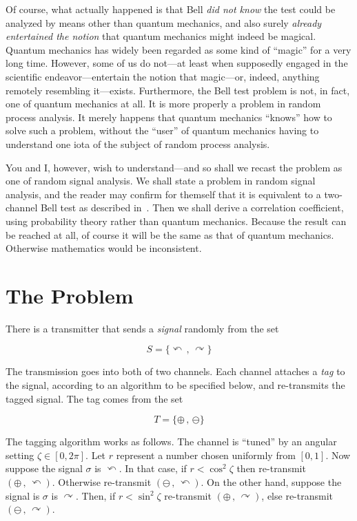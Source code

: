 \documentclass[9pt,technote]{IEEEtran}
\begin{document}
Of course, what actually happened is that Bell {\em{did not know}} the
test could be analyzed by means other than quantum mechanics, and also
surely {\em{already entertained the notion}} that quantum mechanics
might indeed be magical. Quantum mechanics has widely been regarded as
some kind of ``magic'' for a very long time. However, some of us do
not---at least when supposedly engaged in the scientific
endeavor---entertain the notion that magic---or, indeed, anything
remotely resembling it---exists. Furthermore, the Bell test problem is
not, in fact, one of quantum mechanics at all. It is more properly a
problem in random process analysis. It merely happens that quantum
mechanics ``knows'' how to solve such a problem, without the ``user''
of quantum mechanics having to understand one iota of the subject of
random process analysis.

You and I, however, wish to understand---and so shall we recast the
problem as one of random signal analysis. We shall state a problem in
random signal analysis, and the reader may confirm for themself that
it is equivalent to a two-channel Bell test as described
in~\cite{enwiki:1174875317}. Then we shall derive a correlation
coefficient, using probability theory rather than quantum
mechanics. Because the result can be reached at all, of course it will
be the same as that of quantum mechanics. Otherwise mathematics would
be inconsistent.

\section{The Problem}

There is a transmitter that sends a {\em{signal}} randomly from the
set

\begin{equation}
  S=\{\curvearrowleft\,,\,\curvearrowright\}
\end{equation}

The transmission goes into both of two channels. Each channel attaches
a {\em{tag}} to the signal, according to an algorithm to be specified
below, and re-transmits the tagged signal. The tag comes from the set

\begin{equation}
  T=\{\oplus\,,\,\ominus\}
\end{equation}

The tagging algorithm works as follows. The channel is ``tuned'' by an
angular setting $\zeta\in[0,2\pi]$. Let $r$ represent a number chosen
uniformly from $[0,1]$. Now suppose the signal $\sigma$ is
$\curvearrowleft$. In that case, if $r < \cos^2 \zeta$ then
re-transmit $(\oplus\,,\,\curvearrowleft)$. Otherwise re-transmit
$(\ominus\,,\,\curvearrowleft)$. On the other hand, suppose the signal
is $\sigma$ is $\curvearrowright$. Then, if $r < \sin^2 \zeta$
re-transmit $(\oplus\,,\,\curvearrowright)$, else re-transmit
$(\ominus\,,\,\curvearrowright)$.
\end{document}
